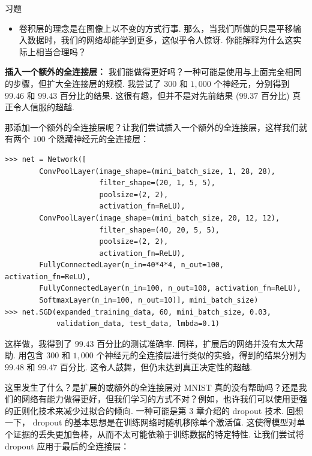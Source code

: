 \begin{exerciseBox}{习题}

\begin{itemize}

\item 卷积层的理念是在图像上以不变的方式行事. 那么，当我们所做的只是平移输入数据时，我们的网络却能学到更多，这似乎令人惊讶. 你能解释为什么这实际上相当合理吗？

\end{itemize}

\textbf{插入一个额外的全连接层：} 我们能做得更好吗？一种可能是使用与上面完全相同的步骤，但扩大全连接层的规模. 我尝试了 $300$ 和 $1,000$ 个神经元，分别得到 $99.46$ 和 $99.43$ 百分比的结果. 这很有趣，但并不是对先前结果 ($99.37$ 百分比) 真正令人信服的超越.

那添加一个额外的全连接层呢？让我们尝试插入一个额外的全连接层，这样我们就有两个 $100$ 个隐藏神经元的全连接层：

\begin{lstlisting}
>>> net = Network([
        ConvPoolLayer(image_shape=(mini_batch_size, 1, 28, 28),
                      filter_shape=(20, 1, 5, 5),
                      poolsize=(2, 2),
                      activation_fn=ReLU),
        ConvPoolLayer(image_shape=(mini_batch_size, 20, 12, 12),
                      filter_shape=(40, 20, 5, 5),
                      poolsize=(2, 2),
                      activation_fn=ReLU),
        FullyConnectedLayer(n_in=40*4*4, n_out=100, activation_fn=ReLU),
        FullyConnectedLayer(n_in=100, n_out=100, activation_fn=ReLU),
        SoftmaxLayer(n_in=100, n_out=10)], mini_batch_size)
>>> net.SGD(expanded_training_data, 60, mini_batch_size, 0.03,
            validation_data, test_data, lmbda=0.1)

\end{lstlisting}

这样做，我得到了 $99.43$ 百分比的测试准确率. 同样，扩展后的网络并没有太大帮助. 用包含 $300$ 和 $1,000$ 个神经元的全连接层进行类似的实验，得到的结果分别为 $99.48$ 和 $99.47$ 百分比. 这令人鼓舞，但仍未达到真正决定性的超越.

这里发生了什么？是扩展的或额外的全连接层对 MNIST 真的没有帮助吗？还是我们的网络有能力做得更好，但我们学习的方式不对？例如，也许我们可以使用更强的正则化技术来减少过拟合的倾向. 一种可能是第 3 章介绍的 dropout 技术. 回想一下， dropout 的基本思想是在训练网络时随机移除单个激活值. 这使得模型对单个证据的丢失更加鲁棒，从而不太可能依赖于训练数据的特定特性. 让我们尝试将 dropout 应用于最后的全连接层：


\end{exerciseBox}
